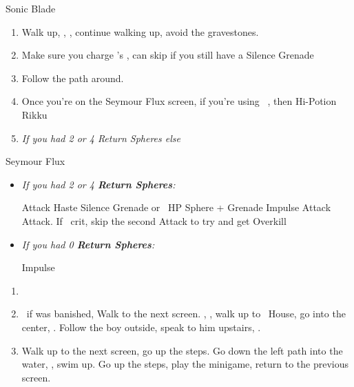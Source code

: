 \begin{multicols}{2}
\begin{equip}
  \begin{itemize}
    \auronf Sonic Blade
  \end{itemize}
\end{equip}
\begin{enumerate}[resume]
  \item Walk up, \sd, \cs[1:20], continue walking up, avoid the gravestones.
  \item Make sure you charge \rikku's \od, can skip if you still have a Silence Grenade
  \item Follow the path around.
  \item Once you're on the Seymour Flux screen, if you're using \rikku\ \od, then Hi-Potion Rikku
   \item \formation{\tidus}{\yuna}{\auron} \textit{If you had 2 or 4 Return Spheres else } \formation{\tidus}{\kimahri}{\wakka}
\end{enumerate}
\begin{battle}[70000]{Seymour Flux}
  \begin{itemize}
    \item \textit{If you had 2 or 4 \textbf{Return Spheres}:}
          \begin{itemize}
            \yunaf Attack
            \tidusf Haste \yuna
            \switch{\auron}{\rikku}
            \rikkuf Silence Grenade or \od\ HP Sphere + Grenade
            \summon{\bahamut}
            \bahamutf Impulse
            \yunaf Attack
            \tidusf Attack. If \yuna\ crit, skip the second Attack to try and get Overkill
          \end{itemize}
    \item \textit{If you had 0 \textbf{Return Spheres}:}
          \begin{itemize}
            \switch{\tidus}{\yuna}
            \summon{\bahamut}
            \bahamutf Impulse
          \end{itemize}
  \end{itemize}
\end{battle}
\begin{enumerate}[resume]
  \item \formation{\tidus}{\kimahri}{\auron}
  \item \save\ if \bahamut was banished, Walk to the next screen. \skippablefmv[0:20], \sd, walk up to \tidus\ House, go into the center, \sd. Follow the boy outside, speak to him upstairs, \sd.
  \item Walk up to the next screen, go up the steps. Go down the left path into the water, \sd, swim up. Go up the steps, play the minigame, return to the previous screen.

\end{enumerate}
\end{multicols}
